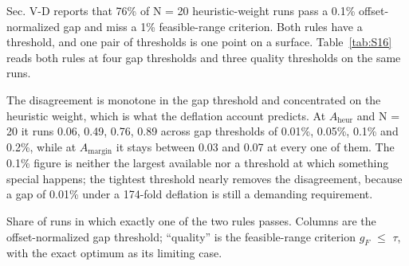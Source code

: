 \documentclass[journal]{IEEEtran}
\begin{document}
Sec. V-D reports that 76\% of N = 20 heuristic-weight runs pass a 0.1\% offset-normalized gap and miss a 1\% feasible-range criterion. Both rules have a threshold, and one pair of thresholds is one point on a surface. Table~\ref{tab:S16} reads both rules at four gap thresholds and three quality thresholds on the same runs.


The disagreement is monotone in the gap threshold and concentrated on the heuristic weight, which is what the deflation account predicts. At $A_{\mathrm{heur}}$ and N = 20 it runs 0.06, 0.49, 0.76, 0.89 across gap thresholds of 0.01\%, 0.05\%, 0.1\% and 0.2\%, while at $A_{\mathrm{margin}}$ it stays between 0.03 and 0.07 at every one of them. The 0.1\% figure is neither the largest available nor a threshold at which something special happens; the tightest threshold nearly removes the disagreement, because a gap of 0.01\% under a 174-fold deflation is still a demanding requirement.


Share of runs in which exactly one of the two rules passes. Columns are the offset-normalized gap threshold; ``quality'' is the feasible-range criterion $g_{F}$ $\leq$ $\tau$, with the exact optimum as its limiting case.
\end{document}
